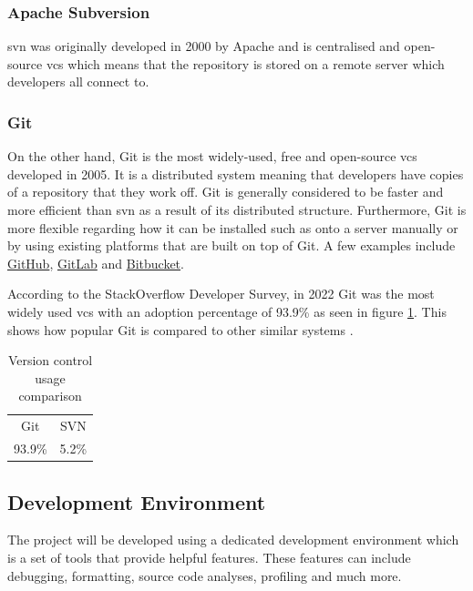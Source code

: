 \documentclass[11pt]{article}
\begin{document}
\subsubsection{Apache Subversion}
\gls*{svn} was originally developed in 2000 by Apache and is centralised and
open-source \gls*{vcs} which means that the repository is stored on a remote
server which developers all connect to.

\subsubsection{Git}
On the other hand, Git is the most widely-used, free and open-source \gls*{vcs}
developed in 2005. It is a distributed system meaning that developers have
copies of a repository that they work off. Git is generally considered to be
faster and more efficient than \gls*{svn} as a result of its distributed
structure. Furthermore, Git is more flexible regarding how it can be installed
such as onto a server manually or by using existing platforms that are built on
top of Git. A few examples include \href{http://github.com}{GitHub},
\href{http://gitlab.com}{GitLab} and \href{https://bitbucket.org/}{Bitbucket}. 

According to the StackOverflow Developer Survey, in 2022 Git was the most widely
used \gls*{vcs} with an adoption percentage of 93.9\% as seen in figure
\ref{tab:vcs_comparison}. This shows how popular Git is compared to other
similar systems \cite{vcs_survey}.

\begin{table}[H]
\begin{center}
  \begin{tabular}{cc}
    
    \rowcolor{gray!50}
    Git & SVN \\
    93.9\% & 5.2\% \\
  \end{tabular}
\end{center}
\caption{Version control usage comparison}
\label{tab:vcs_comparison}
\end{table}



\subsection{Development Environment}

The project will be developed using a dedicated development environment which is
a set of tools that provide helpful features. These features can include
debugging, formatting, source code analyses, profiling and much more.
\end{document}
